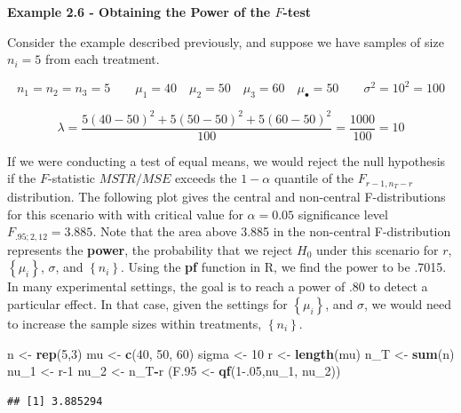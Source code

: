 \documentclass[
]{book}
\newenvironment{Shaded}{\begin{snugshade}}{\end{snugshade}}
\newcommand{\DecValTok}[1]{\textcolor[rgb]{0.00,0.00,0.81}{#1}}
\newcommand{\FloatTok}[1]{\textcolor[rgb]{0.00,0.00,0.81}{#1}}
\newcommand{\FunctionTok}[1]{\textcolor[rgb]{0.13,0.29,0.53}{\textbf{#1}}}
\newcommand{\NormalTok}[1]{#1}
\newcommand{\OtherTok}[1]{\textcolor[rgb]{0.56,0.35,0.01}{#1}}
\newcommand{\SpecialCharTok}[1]{\textcolor[rgb]{0.81,0.36,0.00}{\textbf{#1}}}
\begin{document}
\textbf{Example 2.6 - Obtaining the Power of the \(F\)-test}

Consider the example described previously, and suppose we have samples
of size \(n_i=5\) from each treatment.

\[
n_1=n_2=n_3=5 \qquad \mu_1=40 \quad \mu_2=50 \quad \mu_3=60
\quad \mu_{\bullet}=50\qquad \sigma^2=10^2=100 
\]

\[ 
\lambda = \frac{5(40-50)^2+5(50-50)^2+5(60-50)^2}{100}=\frac{1000}{100}=10
\]

If we were conducting a test of equal means, we would reject the null
hypothesis if the \(F\)-statistic \(MSTR/MSE\) exceeds the \(1-\alpha\)
quantile of the \(F_{r-1,n_T-r}\) distribution. The following plot gives
the central and non-central F-distributions for this scenario with with
critical value for \(\alpha=0.05\) significance level
\(F_{.95;2,12}=3.885\). Note that the area above 3.885 in the
non-central F-distribution represents the \textbf{power}, the
probability that we reject \(H_0\) under this scenario for \(r\),
\(\left\{\mu_i\right\}\), \(\sigma\), and \(\left\{n_i\right\}\). Using
the \textbf{pf} function in R, we find the power to be .7015. In many
experimental settings, the goal is to reach a power of .80 to detect a
particular effect. In that case, given the settings for
\(\left\{\mu_i\right\}\), and \(\sigma\), we would need to increase the
sample sizes within treatments, \(\left\{n_i\right\}\).

\begin{Shaded}
\begin{Highlighting}[]
\NormalTok{n }\OtherTok{\textless{}{-}} \FunctionTok{rep}\NormalTok{(}\DecValTok{5}\NormalTok{,}\DecValTok{3}\NormalTok{)}
\NormalTok{mu }\OtherTok{\textless{}{-}} \FunctionTok{c}\NormalTok{(}\DecValTok{40}\NormalTok{, }\DecValTok{50}\NormalTok{, }\DecValTok{60}\NormalTok{)}
\NormalTok{sigma }\OtherTok{\textless{}{-}} \DecValTok{10}
\NormalTok{r }\OtherTok{\textless{}{-}} \FunctionTok{length}\NormalTok{(mu)}
\NormalTok{n\_T }\OtherTok{\textless{}{-}} \FunctionTok{sum}\NormalTok{(n)}
\NormalTok{nu\_1 }\OtherTok{\textless{}{-}}\NormalTok{ r}\DecValTok{{-}1}
\NormalTok{nu\_2 }\OtherTok{\textless{}{-}}\NormalTok{ n\_T}\SpecialCharTok{{-}}\NormalTok{r}
\NormalTok{(F}\FloatTok{.95} \OtherTok{\textless{}{-}} \FunctionTok{qf}\NormalTok{(}\DecValTok{1}\FloatTok{{-}.05}\NormalTok{,nu\_1, nu\_2))}
\end{Highlighting}
\end{Shaded}

\begin{verbatim}
## [1] 3.885294
\end{verbatim}
\end{document}

